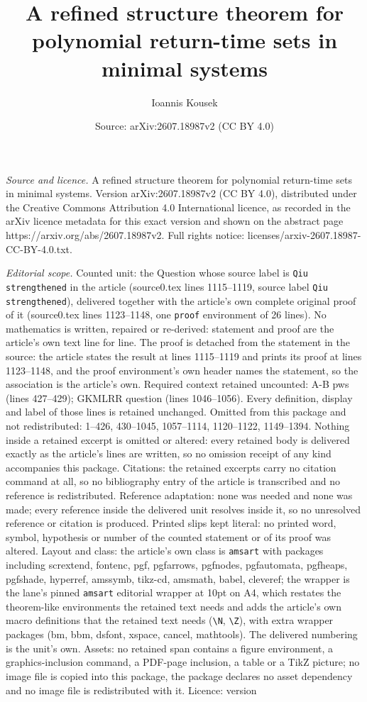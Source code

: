 \documentclass[10pt,a4paper]{amsart}
\title[A refined structure theorem for polynomial return-time sets ]{A refined structure theorem for polynomial return-time sets in minimal systems}
\author{Ioannis Kousek}
\date{Source: arXiv:2607.18987v2 (CC BY 4.0)}
\begin{document}
\maketitle

\noindent\emph{Source and licence.} A refined structure theorem for polynomial return-time sets in minimal systems. Version arXiv:2607.18987v2 (CC BY 4.0), distributed under the Creative Commons Attribution 4.0 International licence, as recorded in the arXiv licence metadata for this exact version and shown on the abstract page https://arxiv.org/abs/2607.18987v2. Full rights notice: licenses/arxiv-2607.18987-CC-BY-4.0.txt.\par\smallskip

\noindent\textit{Editorial scope.} Counted unit: the Question whose source label is \texttt{Qiu strengthened} in the article (source0.tex lines 1115--1119, source label \texttt{Qiu strengthened}), delivered together with the article's own complete original proof of it (source0.tex lines 1123--1148, one \texttt{proof} environment of 26 lines). No mathematics is written, repaired or re-derived: statement and proof are the article's own text line for line. The proof is detached from the statement in the source: the article states the result at lines 1115--1119 and prints its proof at lines 1123--1148, and the proof environment's own header names the statement, so the association is the article's own. Required context retained uncounted: A-B pws (lines 427--429); GKMLRR question (lines 1046--1056). Every definition, display and label of those lines is retained unchanged. Omitted from this package and not redistributed: 1--426, 430--1045, 1057--1114, 1120--1122, 1149--1394. Nothing inside a retained excerpt is omitted or altered: every retained body is delivered exactly as the article's lines are written, so no omission receipt of any kind accompanies this package. Citations: the retained excerpts carry no citation command at all, so no bibliography entry of the article is transcribed and no reference is redistributed. Reference adaptation: none was needed and none was made; every reference inside the delivered unit resolves inside it, so no unresolved reference or citation is produced. Printed slips kept literal: no printed word, symbol, hypothesis or number of the counted statement or of its proof was altered. Layout and class: the article's own class is \texttt{amsart} with packages including scrextend, fontenc, pgf, pgfarrows, pgfnodes, pgfautomata, pgfheaps, pgfshade, hyperref, amssymb, tikz-cd, amsmath, babel, cleveref; the wrapper is the lane's pinned \texttt{amsart} editorial wrapper at 10pt on A4, which restates the theorem-like environments the retained text needs and adds the article's own macro definitions that the retained text needs (\texttt{\textbackslash N}, \texttt{\textbackslash Z}), with extra wrapper packages (bm, bbm, dsfont, xspace, cancel, mathtools). The delivered numbering is the unit's own. Assets: no retained span contains a figure environment, a graphics-inclusion command, a PDF-page inclusion, a table or a TikZ picture; no image file is copied into this package, the package declares no asset dependency and no image file is redistributed with it. Licence: version 
\end{document}
